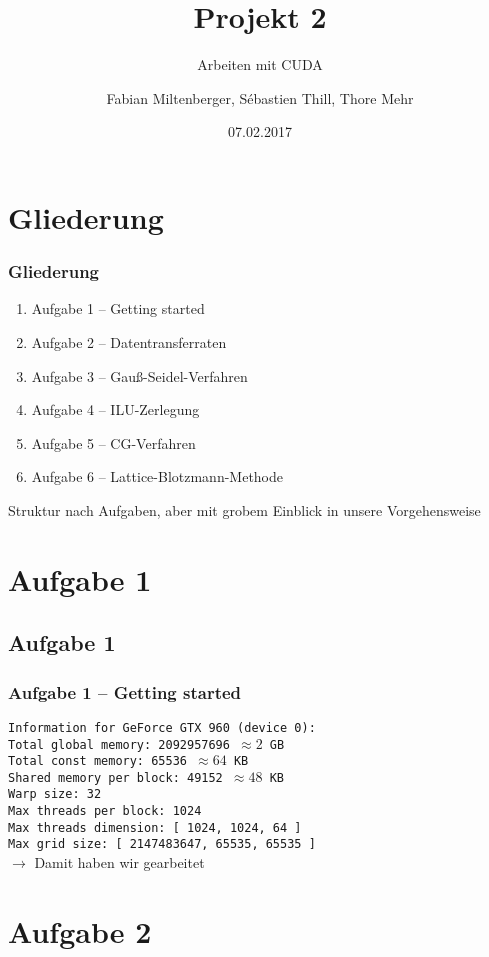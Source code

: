 \documentclass[german,notes,18pt]{beamer}
\title{Projekt 2}
\subtitle{Arbeiten mit CUDA}
\author{Fabian Miltenberger, Sébastien Thill, Thore Mehr}
\date{07.02.2017}
\institute{Lehrstuhl für Rechnerarchitektur und Parallelverarbeitung (ITEC)}
\begin{document}
	
	\frame{\titlepage}
	
	\section{Gliederung}
	\begin{frame}
		\frametitle{Gliederung}
		
		\begin{enumerate}
			\item Aufgabe 1 -- Getting started
			\item Aufgabe 2 -- Datentransferraten
			\item Aufgabe 3 -- Gauß-Seidel-Verfahren
			\item Aufgabe 4 -- ILU-Zerlegung
			\item Aufgabe 5 -- CG-Verfahren
			\item Aufgabe 6 -- Lattice-Blotzmann-Methode
		\end{enumerate}
		Struktur nach Aufgaben, aber mit grobem Einblick in unsere Vorgehensweise
	\end{frame}

	\section{Aufgabe 1}
	\subsection{Aufgabe 1}
	\begin{frame}
		\frametitle{Aufgabe 1 -- Getting started}
		
		\texttt{Information for GeForce GTX 960 (device 0): \\
		Total global  memory: 2092957696 $\approx2$ GB \\
		Total const memory: 65536 $\approx64$ KB \\
		Shared memory per block: 49152 $\approx48$ KB \\
		Warp size: 32 \\
		Max threads per block: 1024 \\
		Max threads dimension: [ 1024, 1024, 64 ] \\
		Max grid size: [ 2147483647, 65535, 65535 ]} \\
		\vspace{2em}
		$\rightarrow$ Damit haben wir gearbeitet
	\end{frame}

	\section{Aufgabe 2}
\end{document}
